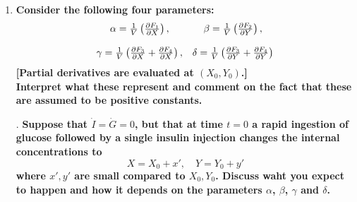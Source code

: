 \begin{homeworkProblem}
\begin{enumerate}
\item \textbf{Consider the following four parameters: \[
    \begin{matrix}
        \alpha = \frac{1}{V}\left(\frac{\partial F_1}{\partial X}\right), & \beta = \frac{1}{V}\left(\frac{\partial F_2}{\partial Y}\right),\\
        \\
        \gamma = \frac{1}{V}\left(\frac{\partial F_3}{\partial X} + \frac{\partial F_4}{\partial X}\right), & \delta = \frac{1}{V}\left(\frac{\partial F_3}{\partial Y} + 
        \frac{\partial F_4}{\partial Y}\right)
    \end{matrix}
\]
[Partial derivatives are evaluated at $(X_0, Y_0)$.]\\
Interpret what these represent and comment on the fact that these are assumed to be positive constants.}\\


\addtocounter{enumi}{1}
\item[\color{red}\theenumi.] \textbf{Suppose that $\dot I = \dot G = 0$, but that at time $t = 0$ a rapid ingestion of glucose followed by a single insulin injection changes the internal concentrations to \[
    X = X_0+x', \quad Y = Y_0+y'
\]
where $x', y'$ are small compared to $X_0, Y_0$. Discuss waht you expect to happen and how it depends on the parameters $\alpha$, $\beta$, $\gamma$ and $\delta$.}\\


\end{enumerate}
\end{homeworkProblem}
